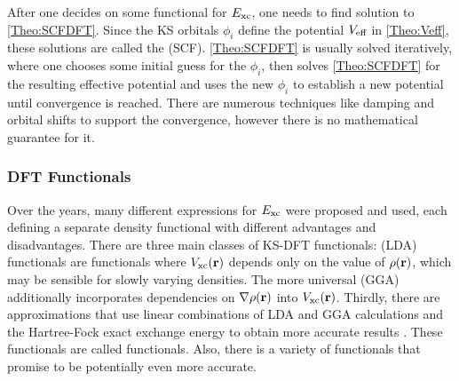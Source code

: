 \documentclass[8.5pt,twoside,twocolumn]{article}
\renewcommand\r{\bo r}
\theoremstyle{standard}
\begin{document}
After one decides on some functional for $E_{\text{xc}}$, one needs to find  solution
to \eqref{Theo:SCFDFT}. Since the KS orbitals $\phi_i$ define the potential $V_{\text{eff}}$ in
\eqref{Theo:Veff}, these solutions are called the  (SCF). 
\eqref{Theo:SCFDFT} is usually solved iteratively, where one chooses some initial guess
for the $\phi_i$, then solves \eqref{Theo:SCFDFT} for the resulting effective potential
and uses the new $\phi_i$ to establish a new potential until convergence is reached.
There are numerous techniques like damping and orbital shifts to support the
convergence, however there is no mathematical guarantee for it. 


\subsubsection{DFT Functionals}
\label{Sec:Theo:Functionals}
Over the years, many different expressions for $E_{\text{xc}}$ were proposed and used, each
defining a separate density functional with different advantages and disadvantages. There
are three main classes of KS-DFT functionals:  (LDA) functionals
are functionals where $\vxc(\r)$ depends only on the value of $\rho(\r)$,
which may be sensible for slowly varying densities. The more universal  (GGA) additionally incorporates dependencies on $\nabla\rho(\r)$ into $\vxc(\r)$. Thirdly,
there are approximations that use linear combinations of LDA and GGA calculations and the
Hartree-Fock exact exchange energy to obtain more accurate results \cite{Becke1993}. 
These functionals are called  functionals. Also, there is a variety
of  functionals that promise to be potentially even more
accurate.
\end{document}
